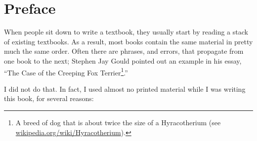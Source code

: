 \documentclass[12pt]{book}
\begin{document}
\chapter{Preface}
\label{preface}













When people sit down to
write a textbook, they usually start by reading a stack of existing
textbooks.  As a result, most books contain the same material in
pretty much the same order.  Often there are phrases,
and errors, that propagate from one book to the next;  Stephen Jay
Gould pointed out an example in his
essay, ``The Case of the Creeping Fox Terrier\footnote{A breed of dog
  that is about twice the size of a Hyracotherium (see
  \url{wikipedia.org/wiki/Hyracotherium}).}.''

I did not do that.  In fact, I used almost no printed material while I
was writing this book, for several reasons:
\end{document}

